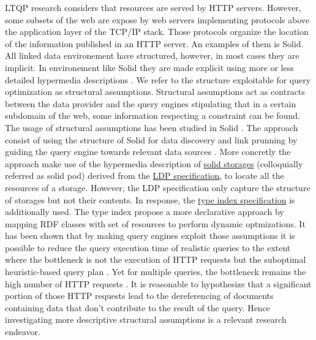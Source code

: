 LTQP research considers that resources are served by HTTP servers.
However, some subsets of the web are expose by web servers implementing protocols above the application layer of the TCP/IP stack.
Those protocols organize the location of the information published in an HTTP server.
An examples of them is Solid.
All linked data environement have structured, however, in most cases they are implicit.
In environement like Solid they are made explicit using more or less detailed hypermedia descriptions \cite{Fielding}.
We refer to the structure exploitable for query optimization as structural assumptions.
Structural assumptions act as contracts between the data provider and 
the query engines stipulating that in a certain subdomain of the web, some information respecting a constraint can be found.
The usage of structural assumptions has been studied in Solid \cite{Taelman2023}.
The approach consist of using the structure of Solid for data discovery and link prunning by guiding the
query engine towards relevant data sources \cite{verborgh2020guided}.
More concretly the approach make use of the hypermedia description of 
\href{https://solidproject.org/TR/protocol#resources}{solid storages} (colloquially referred as solid pod)
derived from the \href{https://www.w3.org/TR/ldp/}{LDP specification},
to locate all the resources of a storage.
However, the LDP specification only capture the structure of storages but not their contents.
In response, the \href{https://solid.github.io/type-indexes/}{type index specification} is additionally used.
The type index propose a more declarative approach \cite{Taelman2017} by mapping RDF classes with set of resources to perform dynamic optmizations.
It has been shown that by making query engines exploit those assumptions it is possible to reduce the query execution time
of realistic queries to the extent where the bottleneck is not the execution of 
HTTP requests but the suboptimal heuristic-based query plan \cite{eschauzier_quweda_2023, Taelman2023}.
Yet for multiple queries, the bottleneck remains the high number of HTTP requests  \cite{eschauzier_quweda_2023}.
It is reasonable to hypothesize that a significant portion of those HTTP requests lead to the dereferencing of
documents containing data that don't contribute to the result of the query.
Hence investigating more descriptive structural assumptions is a relevant research endeavor.

